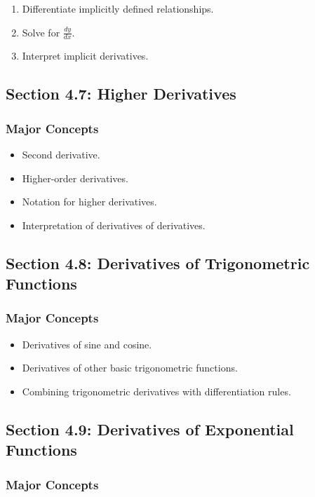 \documentclass[11pt]{article}
\begin{document}
\begin{enumerate}
    \item Differentiate implicitly defined relationships.
    \item Solve for $\frac{dy}{dx}$.
    \item Interpret implicit derivatives.
\end{enumerate}

\subsection{Section 4.7: Higher Derivatives}

\subsubsection{Major Concepts}

\begin{itemize}
    \item Second derivative.
    \item Higher-order derivatives.
    \item Notation for higher derivatives.
    \item Interpretation of derivatives of derivatives.
\end{itemize}

\subsection{Section 4.8: Derivatives of Trigonometric Functions}

\subsubsection{Major Concepts}

\begin{itemize}
    \item Derivatives of sine and cosine.
    \item Derivatives of other basic trigonometric functions.
    \item Combining trigonometric derivatives with differentiation rules.
\end{itemize}

\subsection{Section 4.9: Derivatives of Exponential Functions}

\subsubsection{Major Concepts}
\end{document}
